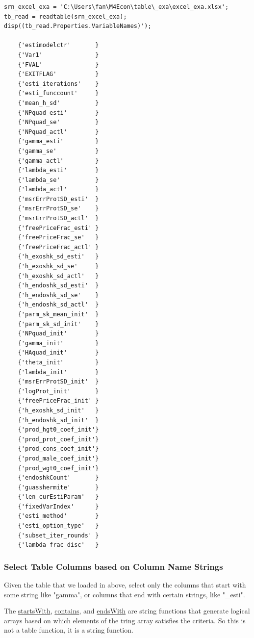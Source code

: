 \documentclass[
]{book}
\begin{document}
\begin{verbatim}
srn_excel_exa = 'C:\Users\fan\M4Econ\table\_exa\excel_exa.xlsx';
tb_read = readtable(srn_excel_exa);
disp((tb_read.Properties.VariableNames)');

    {'estimodelctr'       }
    {'Var1'               }
    {'FVAL'               }
    {'EXITFLAG'           }
    {'esti_iterations'    }
    {'esti_funccount'     }
    {'mean_h_sd'          }
    {'NPquad_esti'        }
    {'NPquad_se'          }
    {'NPquad_actl'        }
    {'gamma_esti'         }
    {'gamma_se'           }
    {'gamma_actl'         }
    {'lambda_esti'        }
    {'lambda_se'          }
    {'lambda_actl'        }
    {'msrErrProtSD_esti'  }
    {'msrErrProtSD_se'    }
    {'msrErrProtSD_actl'  }
    {'freePriceFrac_esti' }
    {'freePriceFrac_se'   }
    {'freePriceFrac_actl' }
    {'h_exoshk_sd_esti'   }
    {'h_exoshk_sd_se'     }
    {'h_exoshk_sd_actl'   }
    {'h_endoshk_sd_esti'  }
    {'h_endoshk_sd_se'    }
    {'h_endoshk_sd_actl'  }
    {'parm_sk_mean_init'  }
    {'parm_sk_sd_init'    }
    {'NPquad_init'        }
    {'gamma_init'         }
    {'HAquad_init'        }
    {'theta_init'         }
    {'lambda_init'        }
    {'msrErrProtSD_init'  }
    {'logProt_init'       }
    {'freePriceFrac_init' }
    {'h_exoshk_sd_init'   }
    {'h_endoshk_sd_init'  }
    {'prod_hgt0_coef_init'}
    {'prod_prot_coef_init'}
    {'prod_cons_coef_init'}
    {'prod_male_coef_init'}
    {'prod_wgt0_coef_init'}
    {'endoshkCount'       }
    {'guasshermite'       }
    {'len_curEstiParam'   }
    {'fixedVarIndex'      }
    {'esti_method'        }
    {'esti_option_type'   }
    {'subset_iter_rounds' }
    {'lambda_frac_disc'   }
\end{verbatim}

\hypertarget{select-table-columns-based-on-column-name-strings}{%
\subsubsection{Select Table Columns based on Column Name Strings}\label{select-table-columns-based-on-column-name-strings}}

Given the table that we loaded in above, select only the columns that
start with some string like "gamma", or columns that end with certain
strings, like "\_esti".

The
\href{https://www.mathworks.com/help/matlab/ref/startswith.html}{startsWith},
\href{https://www.mathworks.com/help/matlab/ref/contains.html}{contains}, and
\href{https://www.mathworks.com/help/matlab/ref/endswith.html}{endsWith} are
string functions that generate logical arrays based on which elements of
the tring array satisfies the criteria. So this is not a table function,
it is a string function.
\end{document}
